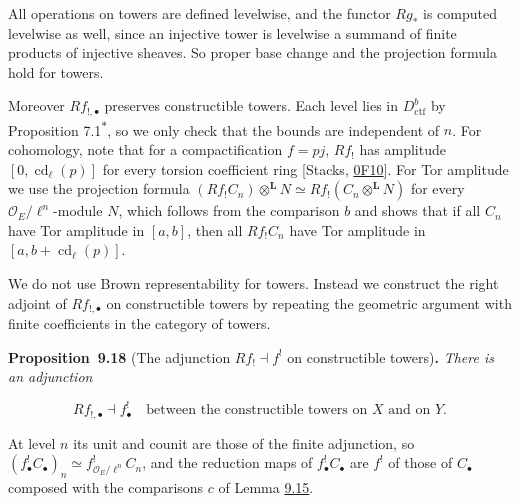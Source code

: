 \documentclass[11pt]{article}
\newenvironment{bpstatement}[2]{\par\addvspace{0.6\baselineskip}\noindent\textbf{#1}#2\textbf{.}\enspace\ignorespaces}
  {\par\addvspace{0.4\baselineskip}}
\newenvironment{bpstatementit}[2]{\begin{bpstatement}{#1}{#2}\itshape\ignorespaces}{\end{bpstatement}}
\newcommand{\bpout}[1]{#1\textsuperscript{\hyperlink{bp-outside}{\ensuremath{\ast}}}}
\begin{document}
\label{bp59}%
All operations on towers are defined levelwise, and the functor \(Rg_*\) is computed levelwise as well, since an injective tower is levelwise a summand of finite products of injective sheaves. So proper base change and the projection formula hold for towers.

Moreover \(Rf_{!,\bullet}\) preserves constructible towers. Each level lies in \(D^b_{\mathrm{ctf}}\) by Proposition \bpout{7.1}, so we only check that the bounds are independent of \(n\). For cohomology, note that for a compactification \(f=pj\), \(Rf_!\) has amplitude \([0,\operatorname{cd}_\ell(p)]\) for every torsion coefficient ring [Stacks, \href{https://stacks.math.columbia.edu/tag/0F10}{0F10}]. For Tor amplitude we use the projection formula \((Rf_!C_n)\otimes^{\mathbf L}N\simeq Rf_!(C_n\otimes^{\mathbf L}N)\) for every \(\mathcal O_E/\ell^n\)-module \(N\), which follows from the comparison \(b\) and shows that if all \(C_n\) have Tor amplitude in \([a,b]\), then all \(Rf_!C_n\) have Tor amplitude in \([a,b+\operatorname{cd}_\ell(p)]\).

We do not use Brown representability for towers. Instead we construct the right adjoint of \(Rf_{!,\bullet}\) on constructible towers by repeating the geometric argument with finite coefficients in the category of towers.

\label{bp60}%
\begin{bpstatementit}{Proposition~9.18}{ (The adjunction $Rf_!\dashv f^!$ on constructible towers)}
There is an adjunction

\[
Rf_{!,\bullet}\dashv f_\bullet^!
\quad\text{between the constructible towers on }X\text{ and on }Y.
\tag{9.18}
\]

At level \(n\) its unit and counit are those of the finite adjunction, so \((f_\bullet^!C_\bullet)_n\simeq f^!_{\mathcal O_E/\ell^n}C_n\), and the reduction maps of \(f_\bullet^!C_\bullet\) are \(f^!\) of those of \(C_\bullet\) composed with the comparisons \(c\) of Lemma \hyperref[bp49]{9.15}.
\end{bpstatementit}
\end{document}
